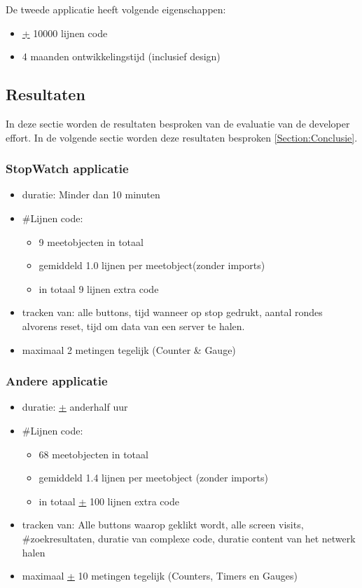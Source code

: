 De tweede applicatie heeft volgende eigenschappen:
\begin{itemize}
\item \underline{+} 10000 lijnen code
\item 4 maanden ontwikkelingstijd (inclusief design)
\end{itemize}

\subsection{Resultaten}
In deze sectie worden de resultaten besproken van de evaluatie van de developer effort. In de volgende sectie worden deze resultaten besproken \ref{Section:Conclusie}.
\subsubsection{StopWatch applicatie}
\begin{itemize}
\item ​​duratie: Minder dan 10 minuten
\item \#Lijnen code:\begin{itemize}
\item 9 meetobjecten in totaal
\item ​gemiddeld 1.0 lijnen per meetobject(zonder imports)
\item in totaal 9 lijnen extra code
\end{itemize}

\item ​​​tracken van: alle buttons, tijd wanneer op stop gedrukt, aantal rondes alvorens reset, tijd om data van een server te halen.

\item maximaal 2 metingen tegelijk (Counter \& Gauge)
\end{itemize}




\subsubsection{Andere applicatie}
\begin{itemize}
\item ​duratie: \underline{+} anderhalf uur
\item \#​Lijnen code: \begin{itemize}
\item 68 meetobjecten in totaal
\item ​​gemiddeld 1.4 lijnen per meetobject (zonder imports)
\item in totaal \underline{+} 100 lijnen extra code
\end{itemize}

\item ​tracken van: Alle buttons waarop geklikt wordt, alle screen visits, \#zoekresultaten, duratie van complexe code, duratie content van het netwerk halen
\item maximaal \underline{+} 10 metingen tegelijk (Counters, Timers en Gauges)
\end{itemize}


